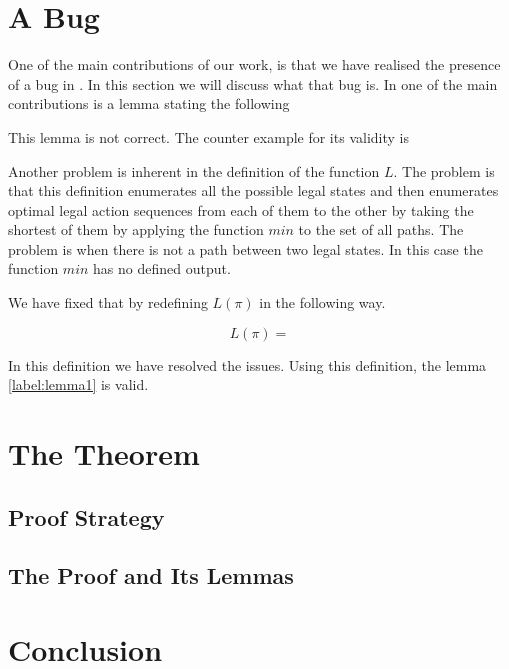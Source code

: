 \documentclass{llncs}
\begin{document}
\section{A Bug}
\label{sec:bug}

One of the main contributions of our work, is that we have realised the presence of a bug in \cite{1}. In this section we will discuss
what that bug is. In \cite{1} one of the main contributions is a lemma stating the following


This lemma is not correct. The counter example for its validity is



Another problem is inherent in the definition of the function \( L\). The problem is that this definition
enumerates all the possible legal states and then enumerates optimal legal action sequences from each of them to the other
by taking the shortest of them by applying the function \( min\) to the set of all paths. The problem is when
there is not a path between two legal states. In this case the function \(min\) has no defined output.

We have fixed that by redefining \(L(\pi)\) in the following way.

\begin{equation}
\label{eqn:Lnew}
L(\pi) =
\end{equation}


In this definition we have resolved the issues.
Using this definition, the lemma \ref{label:lemma1} is valid.



\section{The Theorem}
\label{sec:theorem}

\subsection{Proof Strategy}
\label{sec:proof-strategy}

\subsection{The Proof and Its Lemmas}
\label{sec:lemmas}

\section{Conclusion}
\end{document}
